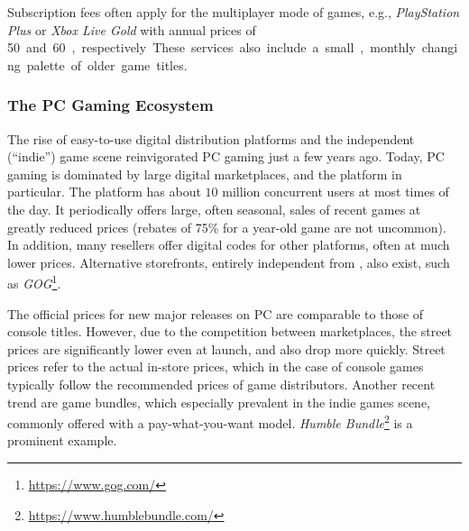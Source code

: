 
Subscription fees often apply for the multiplayer mode of games, e.g., \textit{PlayStation Plus} or \textit{Xbox Live Gold} with annual prices of \SI{50}[\EUR] and \SI{60}[\EUR], respectively. These services also include a small, monthly changing palette of older game titles.




\subsubsection{The PC Gaming Ecosystem}
\label{sec:pcgaming}

The rise of easy-to-use digital distribution platforms and the independent (``indie'') game scene reinvigorated PC gaming just a few years ago. Today, PC gaming is dominated by large digital marketplaces, and the \steam platform in particular. The platform has about $10$ million concurrent users at most times of the day. It periodically offers large, often seasonal, sales of recent games at greatly reduced prices (rebates of 75\% for a year-old game are not uncommon). In addition, many resellers offer digital codes for other platforms, often at much lower prices. Alternative storefronts, entirely independent from \steam, also exist, such as \textit{GOG}\footnote{\url{https://www.gog.com/}}.%


The official prices for new major releases on PC are comparable to those of console titles. However, due to the competition between marketplaces, the street prices are significantly lower even at launch, and also drop more quickly. Street prices refer to the actual in-store prices, which in the case of console games typically follow the recommended prices of game distributors. Another recent trend are game bundles, which especially prevalent in the indie games scene, commonly offered with a pay-what-you-want model. \textit{Humble Bundle}\footnote{\url{https://www.humblebundle.com/}} is a prominent example. %



